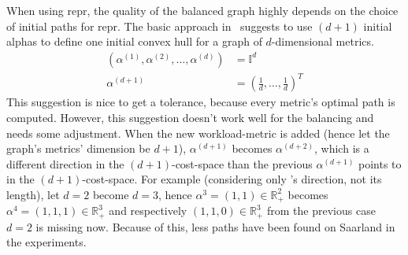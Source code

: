         When using \gls{repr}, the quality of the balanced graph highly depends on the choice of initial paths for \gls{repr}.
        The basic approach in~\cite{barth:alternative_multicriteria_routes} suggests to use $(d+1)$ initial alphas to define one initial convex hull for a graph of $d$-dimensional \glspl{metric}.
        \begin{equation}
        \label{eq:init_alphas}
        \begin{aligned}
            \left( \alpha^{(1)}, \alpha^{(2)}, \dots, \alpha^{(d)} \right) &= \mathbb{I}^d\\
            \alpha^{(d+1)} &= \left( \frac{1}{d}, \dots, \frac{1}{d} \right)^T
        \end{aligned}
        \end{equation}
        This suggestion is nice to get a tolerance, because every \gls{metric}'s optimal path is computed.
        However, this suggestion doesn't work well for the \gls{balancing} and needs some adjustment.
        When the new workload-\gls{metric} is added (hence let the graph's \glspl{metric}' dimension be $d+1$), $\alpha^{(d+1)}$ becomes $\alpha^{(d+2)}$, which is a different direction in the $(d+1)$-cost-space than the previous $\alpha^{(d+1)}$ points to in the $(d+1)$-cost-space.
        For example (considering only \alpha's direction, not its length), let $d=2$ become $d=3$, hence $\alpha^3=(1, 1) \in \mathbb{R}_+^2$ becomes $\alpha^4=(1, 1, 1) \in \mathbb{R}_+^3$ and respectively $(1, 1, 0) \in \mathbb{R}_+^3$ from the previous case $d=2$ is missing now.
        Because of this, less paths have been found on Saarland in the experiments.
